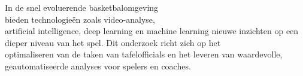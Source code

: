



In de snel evoluerende basketbalomgeving \\bieden technologieën zoals video-analyse, \\artificial intelligence, deep learning en machine learning nieuwe inzichten op een dieper niveau van het spel. %
Dit onderzoek richt zich op het \\optimaliseren van de taken van tafelofficials en het leveren van waardevolle, geautomatiseerde analyses voor spelers en coaches.\\

